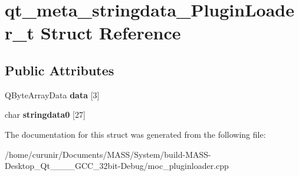 \hypertarget{structqt__meta__stringdata___plugin_loader__t}{}\section{qt\+\_\+meta\+\_\+stringdata\+\_\+\+Plugin\+Loader\+\_\+t Struct Reference}
\label{structqt__meta__stringdata___plugin_loader__t}
\subsection*{Public Attributes}
\begin{DoxyCompactItemize}
\item 
Q\+Byte\+Array\+Data {\bfseries data} \mbox{[}3\mbox{]}\hypertarget{structqt__meta__stringdata___plugin_loader__t_ab96f60b7624ed3979315a61564d29334}{}\label{structqt__meta__stringdata___plugin_loader__t_ab96f60b7624ed3979315a61564d29334}

\item 
char {\bfseries stringdata0} \mbox{[}27\mbox{]}\hypertarget{structqt__meta__stringdata___plugin_loader__t_a403d50c87ad2f0cf3f33eed77ac2d166}{}\label{structqt__meta__stringdata___plugin_loader__t_a403d50c87ad2f0cf3f33eed77ac2d166}

\end{DoxyCompactItemize}


The documentation for this struct was generated from the following file\+:\begin{DoxyCompactItemize}
\item 
/home/curunir/\+Documents/\+M\+A\+S\+S/\+System/build-\/\+M\+A\+S\+S-\/\+Desktop\+\_\+\+Qt\+\_\+\_\+\_\+\_\+\+G\+C\+C\+\_\+32bit-\/\+Debug/moc\+\_\+pluginloader.\+cpp\end{DoxyCompactItemize}

